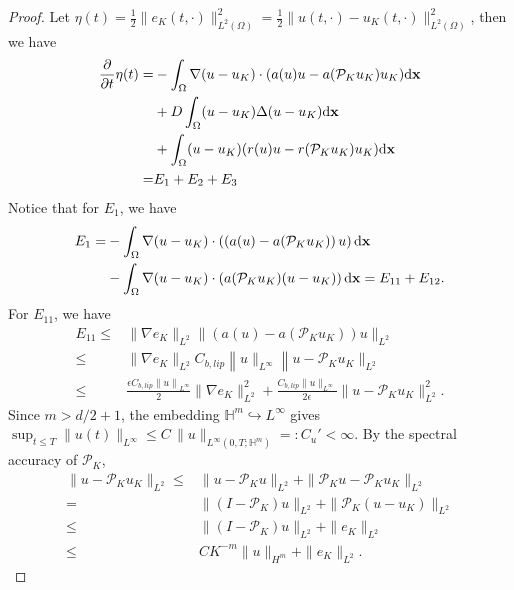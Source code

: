 \documentclass[a4paper,fleqn]{cas-sc}
\theoremstyle{definition}
\theoremstyle{remark}
\begin{document}
\begin{proof}
    Let $\eta(t) = \frac{1}{2}\|e_K(t,\cdot)\|^2_{L^2(\Omega)}  = \frac{1}{2}\|u(t,\cdot)- u_K(t,\cdot)\|^2_{L^2(\Omega)} $, then we have 
    \begin{equation}
        \begin{aligned}
    \frac{\partial}{\partial t} \eta(t)
        = & -\int_\Omega \nabla (u-u_K)\cdot (a(u)u - a(\mathcal P_K u_K )u_K )\mathrm{d} \mathbf{x} \\
        & + D\int_\Omega (u-u_K)  \Delta (u -  u_K  )\mathrm{d} \mathbf{x} \\
        & + \int_\Omega (u-u_K)  (r(u)u - r(\mathcal P_K  u_K ) u_K) \mathrm{d} \mathbf{x}  \\
        = &  E_1 + E_2 + E_3
        \end{aligned}
    \end{equation}
Notice that for $E_1$, we have
\[
\begin{aligned}
    E_1 =& -\int_\Omega \nabla(u-u_K) \cdot \left(\left(a(u) - a(\mathcal P_K u_K )\right)u\right) \mathrm{d} \mathbf{x}\\
    &- \int_\Omega \nabla(u-u_K) \cdot \left(a(\mathcal P_K u_K )(u  - u_K )\right)\mathrm{d} \mathbf{x} = E_{11}+ E_{12}.\\
\end{aligned}
\]
For $E_{11}$, we have 
\[
\begin{aligned}
E_{11} \leq & \|\nabla e_K \|_{L^2} \|\left(a(u) - a(\mathcal P_K u_K )\right) u \|_{L^2}\\
 \leq& \|\nabla e_K \|_{L^2} C_{b,lip}\left\|u\|_{L^\infty}\right\|u - \mathcal P_K u_K \|_{L^2}\\
\leq&  \frac{\epsilon C_{b,lip} \left\|u\right\|_{L^\infty} }{2} \|\nabla e_K \|_{L^2}^2 
+\frac{C_{b,lip}\|u\|_{L^\infty}}{2\epsilon} \|u - \mathcal P_K u_K\|_{L^2}^2.
\end{aligned}
\]
Since $m>d/2+1$, the embedding $\mathbb H^m\hookrightarrow L^\infty$ gives
$\sup_{t\le T}\|u(t)\|_{L^\infty}\le C\,\|u\|_{L^\infty(0,T;\mathbb H^m)}=:C_u'<\infty$. By the spectral accuracy of $\mathcal P_K$,
\[
\begin{aligned}
\|u - \mathcal P_K u_K\|_{L^2} \leq& \|u - \mathcal P_K u\|_{L^2} + \|\mathcal P_K u - \mathcal P_K u_K\|_{L^2}\\
=& \|(I - \mathcal P_K) u\|_{L^2} + \|\mathcal  P_K (u - u_K)\|_{L^2} \\
\leq &\|(I - \mathcal P_K) u\|_{L^2} + \|e_K\|_{L^2}\\
\leq & C K^{-m} \|u\|_{H^m} + \|e_K\|_{L^2}.
\end{aligned}
\]
\end{proof}
\end{document}
